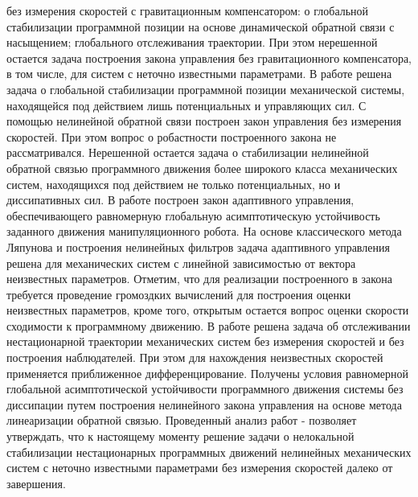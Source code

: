{без измерения скоростей с гравитационным компенсатором: о глобальной стабилизации программной позиции на основе динамической обратной связи с насыщением; глобального отслеживания траектории. При этом нерешенной остается задача построения закона управления без гравитационного компенсатора, в том числе, для систем с неточно известными параметрами. В работе \cite{burkov2} решена задача о глобальной стабилизации программной позиции механической системы, находящейся под действием лишь потенциальных и управляющих сил. С помощью нелинейной обратной связи построен закон управления без измерения скоростей. При этом вопрос о робастности построенного закона не рассматривался. Нерешенной остается задача о стабилизации нелинейной обратной связью программного движения более широкого класса механических систем, находящихся под действием не только потенциальных, но и диссипативных сил. В работе \cite{yarza} построен закон адаптивного управления, обеспечивающего равномерную глобальную асимптотическую устойчивость заданного движения манипуляционного робота. На основе классического метода Ляпунова и построения нелинейных фильтров задача адаптивного управления решена для механических систем с линейной зависимостью от вектора неизвестных параметров. Отметим, что для реализации построенного в \cite{yarza} закона требуется проведение громоздких вычислений для построения оценки неизвестных параметров, кроме того, открытым остается вопрос оценки скорости сходимости к программному движению. В работе \cite{loria3} решена задача об отслеживании нестационарной траектории механических систем без измерения скоростей и без построения наблюдателей. При этом для нахождения неизвестных скоростей применяется приближенное дифференцирование. Получены условия равномерной глобальной асимптотической устойчивости программного движения системы без диссипации путем построения нелинейного закона управления на основе метода линеаризации обратной 
	связью. Проведенный анализ работ \cite{nicosia} - \cite{loria3} позволяет утверждать, что к настоящему моменту решение задачи о нелокальной стабилизации нестационарных программных движений нелинейных механических систем с неточно известными параметрами без измерения скоростей далеко от завершения.
	
}
